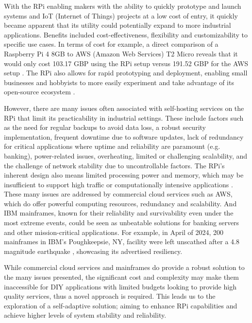 \documentclass[conference]{IEEEtran}
\begin{document}
With the RPi enabling makers with the ability to quickly prototype and launch systems and IoT (Internet of Things) projects at a low cost of entry, it quickly became apparent that its utility could potentially expand to more industrial applications. Benefits included cost-effectiveness, flexibility and customizability to specific use cases. In terms of cost for example, a direct comparison of a Raspberry Pi 4 8GB to AWS (Amazon Web Services) T2 Micro reveals that it would only cost 103.17 GBP using the RPi setup versus 191.52 GBP for the AWS setup \cite{pi_vs_AWS}. The RPi also allows for rapid prototyping and deployment, enabling small businesses and hobbyists to more easily experiment and take advantage of its open-source ecosystem \cite{pi_history}.

However, there are many issues often associated with self-hosting services on the RPi that limit its practicability in industrial settings. These include factors such as the need for regular backups to avoid data loss, a robust security implementation, frequent downtime due to software updates, lack of redundancy for critical applications where uptime and reliability are paramount (e.g. banking), power-related issues, overheating, limited or challenging scalability, and the challenge of network stability due to uncontrollable factors. The RPi's inherent design also means limited processing power and memory, which may be insufficient to support high traffic or computationally intensive applications \cite{pi_headaches,pi_website_hosting}. These many issues are addressed by commercial cloud services such as AWS, which do offer powerful computing resources, redundancy and scalability. And IBM mainframes, known for their reliability and survivability even under the most extreme events, could be seen as unbeatable solutions for banking servers and other mission-critical applications. For example, in April of 2024, 200 mainframes in IBM's Poughkeepsie, NY, facility were left unscathed after a 4.8 magnitude earthquake \cite{IBM_mainframes}, showcasing its advertised resiliency.

While commercial cloud services and mainframes do provide a robust solution to the many issues presented, the significant cost and complexity may make them inaccessible for DIY applications with limited budgets looking to provide high quality services, thus a novel approach is required. This leads us to the exploration of a self-adaptive solution; aiming to enhance RPi capabilities and achieve higher levels of system stability and reliability.
\end{document}
